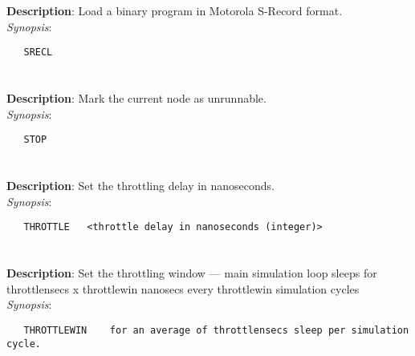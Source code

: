 \section{\quad{}}
\label{manpages:SRECL}
\label{manpages:srecl}
\vspace{-0.1in}
{\bf Description}: 	Load a binary program in Motorola S-Record format.\\[1.5ex]
{\em Synopsis}:
\vspace{-0.05in}
\scriptsize
\begin{lstlisting}
   SRECL   								
\end{lstlisting}
\normalsize
\vspace{-0.05in}


\section{\quad{}}
\label{manpages:STOP}
\label{manpages:stop}
\vspace{-0.1in}
{\bf Description}: 	Mark the current node as unrunnable.\\[1.5ex]
{\em Synopsis}:
\vspace{-0.05in}
\scriptsize
\begin{lstlisting}
   STOP   																				
\end{lstlisting}
\normalsize
\vspace{-0.05in}


\section{\quad{}}
\label{manpages:THROTTLE}
\label{manpages:throttle}
\vspace{-0.1in}
{\bf Description}: 	Set the throttling delay in nanoseconds.\\[1.5ex]
{\em Synopsis}:
\vspace{-0.05in}
\scriptsize
\begin{lstlisting}
   THROTTLE   <throttle delay in nanoseconds (integer)>															
\end{lstlisting}
\normalsize
\vspace{-0.05in}


\section{\quad{}}
\label{manpages:THROTTLEWIN}
\label{manpages:throttlewin}
\vspace{-0.1in}
{\bf Description}: 	Set the throttling window --- main simulation loop sleeps for throttlensecs x throttlewin nanosecs every throttlewin simulation cycles\\[1.5ex]
{\em Synopsis}:
\vspace{-0.05in}
\scriptsize
\begin{lstlisting}
   THROTTLEWIN    for an average of throttlensecs sleep per simulation cycle.
\end{lstlisting}
\normalsize
\vspace{-0.05in}


